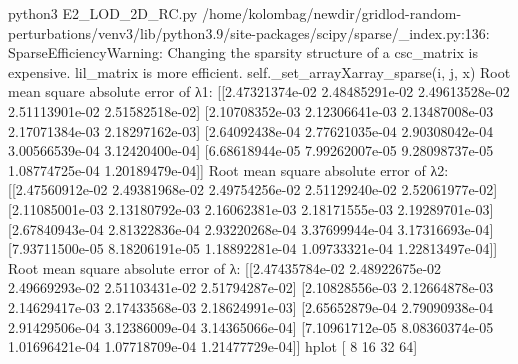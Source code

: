  python3 E2_LOD_2D_RC.py
/home/kolombag/newdir/gridlod-random-perturbations/venv3/lib/python3.9/site-packages/scipy/sparse/_index.py:136: SparseEfficiencyWarning: Changing the sparsity structure of a csc_matrix is expensive. lil_matrix is more efficient.
  self._set_arrayXarray_sparse(i, j, x)
Root mean square absolute error of λ1:
 [[2.47321374e-02 2.48485291e-02 2.49613528e-02 2.51113901e-02
  2.51582518e-02]
 [2.10708352e-03 2.12306641e-03 2.13487008e-03 2.17071384e-03
  2.18297162e-03]
 [2.64092438e-04 2.77621035e-04 2.90308042e-04 3.00566539e-04
  3.12420400e-04]
 [6.68618944e-05 7.99262007e-05 9.28098737e-05 1.08774725e-04
  1.20189479e-04]]
Root mean square absolute error of λ2: 
 [[2.47560912e-02 2.49381968e-02 2.49754256e-02 2.51129240e-02
  2.52061977e-02]
 [2.11085001e-03 2.13180792e-03 2.16062381e-03 2.18171555e-03
  2.19289701e-03]
 [2.67840943e-04 2.81322836e-04 2.93220268e-04 3.37699944e-04
  3.17316693e-04]
 [7.93711500e-05 8.18206191e-05 1.18892281e-04 1.09733321e-04
  1.22813497e-04]]
Root mean square absolute error of λ: 
 [[2.47435784e-02 2.48922675e-02 2.49669293e-02 2.51103431e-02
  2.51794287e-02]
 [2.10828556e-03 2.12664878e-03 2.14629417e-03 2.17433568e-03
  2.18624991e-03]
 [2.65652879e-04 2.79090938e-04 2.91429506e-04 3.12386009e-04
  3.14365066e-04]
 [7.10961712e-05 8.08360374e-05 1.01696421e-04 1.07718709e-04
  1.21477729e-04]]
hplot [ 8 16 32 64]